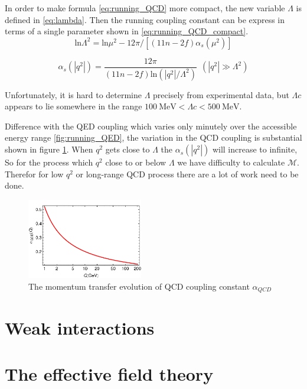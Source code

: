 In order to make formula \ref{eq:running_QCD} more compact, the new variable $\Lambda$ is defined in \ref{eq:lambda}. Then the running coupling constant can be express in terms of a single parameter shown in \ref{eq:running_QCD_compact}.
\begin{equation}
\mathrm{ln}\Lambda^{2}=\mathrm{ln}\mu^{2}-12\pi/[(11n-2f)\alpha_{s}(\mu^{2})]
\label{eq:lambda}
\end{equation}

\begin{equation}
\alpha_{s}(|q^{2}|)=\frac{12\pi}{(11n-2f)\mathrm{ln}(|q^{2}|/\Lambda^{2})}~~(|q^{2}|\gg\Lambda^{2})
\label{eq:running_QCD_compact}
\end{equation}

Unfortunately, it is hard to determine $\Lambda$ precisely from experimental data, but $\Lambda c$ appears to lie somewhere in the range $100~\mathrm{MeV}<\Lambda c<500~ \mathrm{MeV}$.

Difference with the QED coupling which varies only minutely over the accessible energy range \ref{fig:running_QED}, the variation in the QCD coupling is substantial shown in figure \ref{fig:QCD_running}. When $q^{2}$ gets close to $\Lambda$ the $\alpha_{s}(|q^{2}|)$ will increase to infinite, So for the process which $q^{2}$ close to or below $\Lambda$ we have difficulty to calculate $\mathcal{M}$. Therefor for low $q^{2}$ or long-range QCD process there are a lot of work need to be done.
\begin{figure}[h!]
 \begin{center}
\includegraphics[width=0.45\textwidth]{figures/theory/alphaQCD.png}
\caption{The momentum transfer evolution of QCD coupling constant $\alpha_{QCD}$ \cite{Roberts:2012sv}}
  \label{fig:QCD_running}
 \end{center}
\end{figure}
\section{Weak interactions}\label{subsec:Weak}


\section{The effective field theory}\label{subsec:EFT}

